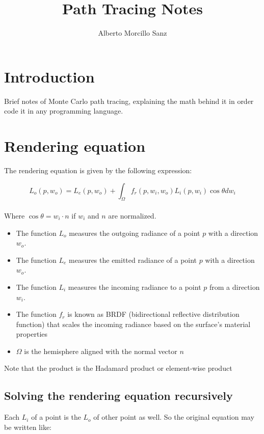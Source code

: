 \documentclass{article}
\title{Path Tracing Notes}
\author{Alberto Morcillo Sanz}
\begin{document}
\maketitle

\section{Introduction}

Brief notes of Monte Carlo path tracing, explaining the math behind it in order code it in any programming language.

\section{Rendering equation}

The rendering equation is given by the following expression:

$$L_{o} \left (  p, w_{o} \right ) = L_{e} \left (  p, w_{o} \right ) + \int_{\Omega} f_{r}\left (  p, w_{i}, w_{o} \right ) L_{i} \left (  p, w_{i} \right ) \cos{\theta} dw_{i}$$
\\
Where $\cos{\theta} = w_{i} \cdot n$ if $w_{i}$ and $n$ are normalized.

\begin{itemize}
\item The function $L_{o} $ measures the outgoing radiance of a point $p$ with a direction $w_{o}$.
\item The function $L_{e} $ measures the emitted radiance of a point $p$ with a direction $w_{o}$.
\item The function $L_{i} $ measures the incoming radiance to a point $p$ from a direction $w_{i}$.
\item The function $f_{r}$ is known as BRDF (bidirectional reflective distribution function) that scales the incoming radiance based on the surface's material properties
\item $\Omega$ is the hemisphere aligned with the normal vector $n$
\end{itemize}

Note that the product is the Hadamard product or element-wise product 

\subsection{Solving the rendering equation recursively}

Each $L_{i}$ of a point is the $L_{o}$ of other point as well. So the original equation may be written like:
\end{document}
